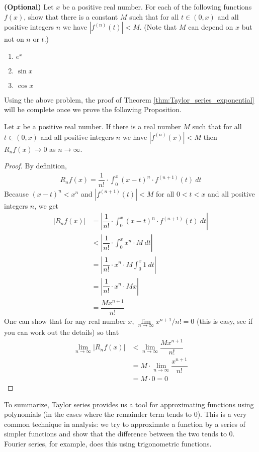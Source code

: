\begin{exercise} {\bf (Optional)}
  Let $x$ be a positive real number.
   For each of the following functions $f(x)$, show that there is a constant $M$ such that for all $ t \in (0,x)$  and all positive integers $n$ we have $|f^{(n)}(t)| < M$. (Note that $M$ can depend on $x$ but not on $n$ or $t$.)
   \begin{multicols}{2}
     \begin{enumerate}
       \item $e^x$
       \item $\sin x$
       \item $\cos x$
     \end{enumerate}
   \end{multicols}
\end{exercise}
Using the above problem, the proof of Theorem \ref{thm:Taylor_series_exponential} will be complete once we prove the following Proposition.
\begin{prop}
  Let $x$ be a positive real number. If there is a real number $M$ such that for all $ t \in (0,x)$  and all positive integers $n$ we have $|f^{(n)}(x)| < M$ then $R_n f(x) \rightarrow 0$ as $n \rightarrow \infty$.
\end{prop}
\begin{proof}
  By definition,
  \begin{align*}
    R_n f(x) = \dfrac{1}{n!} \cdot \int_0^x {(x-t)^n \cdot {f^{(n+1)}(t)}} \: dt
  \end{align*}
  Because $(x-t)^n < x^n$ and $|f^{(n+1)}(t)| < M$ for all $0 < t < x$  and all positive integers $n$, we get
  \begin{align*}
    |R_n f(x)|
    &=
    \left|\dfrac{1}{n!} \cdot \int_0^x {(x-t)^n \cdot {f^{(n+1)}(t)}} \: dt \right|\\
    &< \left|\dfrac{1}{n!} \cdot \int_0^x x^n \cdot M \: dt \right| \\
    &=  \left|\dfrac{1}{n!} \cdot x^n \cdot M \int_0^x 1 \: dt \right| \\
    &=  \left|\dfrac{1}{n!} \cdot x^n \cdot M x \right| \\
    &= \dfrac{M x^{n+1}}{n!}
  \end{align*}
  One can show that for any real number $x$, $\lim \limits_{n \rightarrow \infty} x^{n+1} / n! = 0$ (this is easy, see if you can work out the details) so that
\begin{align*}
    \lim \limits_{n \rightarrow \infty} |R_n f(x)|
    &<
    \lim \limits_{n \rightarrow \infty} \dfrac{M x^{n+1}}{n!}
    \\
    &= {M}\cdot \lim \limits_{n \rightarrow \infty} \dfrac{x^{n+1}}{n!} \\
    &= M \cdot 0 = 0
\end{align*}
\end{proof}

To summarize, Taylor series provides us a tool for approximating functions using polynomials (in the cases where the remainder term tends to 0).
This is a very common technique in analysis: we try to approximate a function by a series of simpler functions and show that the difference between the two tends to 0.
Fourier series, for example, does this using trigonometric functions.
